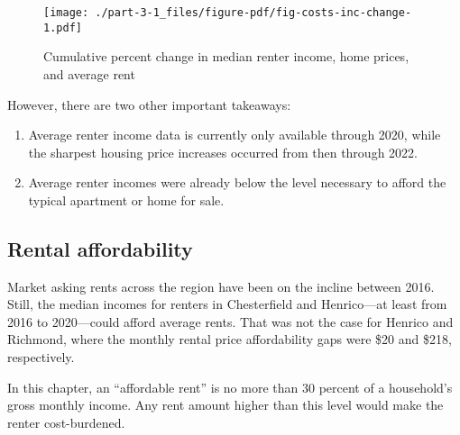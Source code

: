 \documentclass[
  letterpaper,
  DIV=11,
  numbers=noendperiod]{scrreprt}
\providecommand{\tightlist}{%
  \setlength{\itemsep}{0pt}\setlength{\parskip}{0pt}}\usepackage{longtable,booktabs,array}
\begin{document}
\begin{figure}

{\centering \texttt{[image: ./part-3-1\_files/figure-pdf/fig-costs-inc-change-1.pdf]}

}

\caption{\label{fig-costs-inc-change}Cumulative percent change in median
renter income, home prices, and average rent}

\end{figure}

However, there are two other important takeaways:

\begin{enumerate}
\def\labelenumi{\arabic{enumi}.}
\tightlist
\item
  Average renter income data is currently only available through 2020,
  while the sharpest housing price increases occurred from then through
  2022.
\item
  Average renter incomes were already below the level necessary to
  afford the typical apartment or home for sale.
\end{enumerate}

\hypertarget{rental-affordability}{%
\subsection{Rental affordability}\label{rental-affordability}}

Market asking rents across the region have been on the incline between
2016. Still, the median incomes for renters in Chesterfield and
Henrico---at least from 2016 to 2020---could afford average rents. That
was not the case for Henrico and Richmond, where the monthly rental
price affordability gaps were \$20 and \$218, respectively.

\begin{tcolorbox}[enhanced jigsaw, colframe=quarto-callout-tip-color-frame, arc=.35mm, bottomrule=.15mm, colbacktitle=quarto-callout-tip-color!10!white, opacityback=0, left=2mm, rightrule=.15mm, title=\textcolor{quarto-callout-tip-color}{\faLightbulb}\hspace{0.5em}{Calculating rental affordability}, colback=white, coltitle=black, toptitle=1mm, leftrule=.75mm, titlerule=0mm, breakable, opacitybacktitle=0.6, toprule=.15mm, bottomtitle=1mm]

In this chapter, an ``affordable rent'' is no more than 30 percent of a
household's gross monthly income. Any rent amount higher than this level
would make the renter cost-burdened.

\end{tcolorbox}
\end{document}
